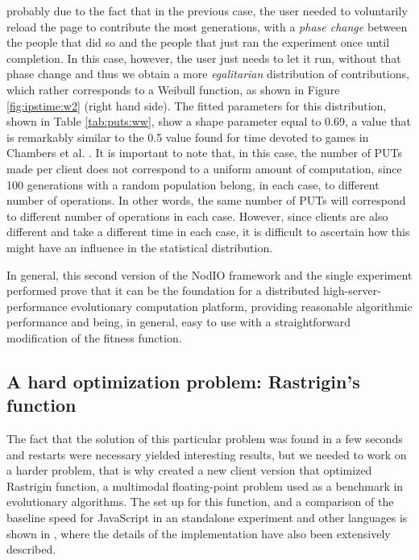 \documentclass{sig-alternate}
\begin{document}
probably due to the fact that in the previous case, the user needed to
voluntarily reload the page to contribute the most generations, with a
{\em phase change} between the people that did so and the people that
just ran the experiment once until completion. In this case, however, the
user just needs to let it run, without that phase change and thus we obtain a
more {\em egalitarian} distribution of contributions, which rather
corresponds to a Weibull function, as shown in Figure
\ref{fig:ipstime:w2} (right hand side). The fitted parameters for this
distribution, shown in Table \ref{tab:puts:ww}, show a shape parameter
equal to 0.69, a value that is remarkably similar to the 0.5 value
found for time devoted to games in Chambers et
al. \cite{chambers2005measurement}. It is important to note that, in
this case, the number of PUTs made per client does not correspond to a
uniform amount of computation, since 100 generations with a random
population belong, in each case, to different number of
operations. In other words, the same number of PUTs will correspond to
different number of operations in each case. However, since clients
are also different and take a different time in each case, it is
difficult to ascertain how this might have an influence in the
statistical distribution.

In general, this second version of the {\sf NodIO} framework and the
single experiment performed prove that it can be the foundation for a distributed
high-server-performance evolutionary computation platform,
providing reasonable algorithmic performance and being, in general,
easy to use with a straightforward modification of the fitness
function. 

\subsection{A hard optimization problem: Rastrigin's function}
\label{sec:rastrigin}

The fact that the solution of this particular problem was found in a
few seconds and restarts were necessary yielded interesting results,
but we needed to work on a harder problem, that is why created a new
client version that optimized Rastrigin function, a multimodal
floating-point problem used as a benchmark in evolutionary
algorithms. The set up for this function, and a comparison of the
baseline speed for JavaScript in an standalone experiment and other
languages is shown in \cite{2016arXiv160101607Manom}, where the details of
the implementation have also been extensively described. 
\end{document}
